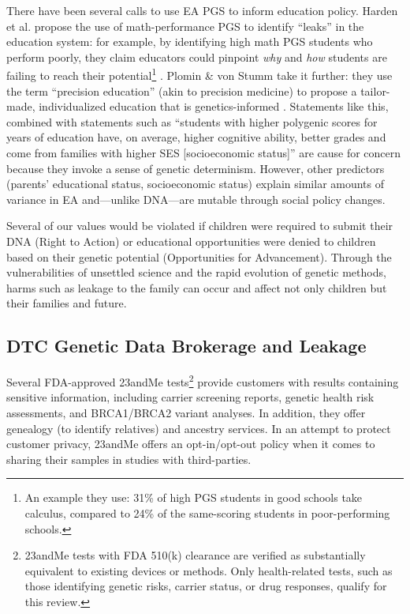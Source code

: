 There have been several calls to use EA PGS to inform education policy. Harden et al. propose the use of math-performance PGS to identify ``leaks'' in the education system: for example, by identifying high math PGS students who perform poorly, they claim educators could pinpoint \textit{why} and \textit{how} students are failing to reach their potential\footnote{An example they use: 31\% of high PGS students in good schools take calculus, compared to 24\% of the same-scoring students in poor-performing schools.} \cite{harden_genetic_2020}. Plomin \& von Stumm take it further: they use the term ``precision education'' (akin to precision medicine) to propose a tailor-made, individualized education that is genetics-informed \cite{r_new_2018}. Statements like this, combined with statements such as ``students with higher polygenic scores for years of education have, on average, higher cognitive ability, better grades and come from families with higher SES [socioeconomic status]'' \cite{smith-woolley_differences_2018} are cause for concern because they invoke a sense of genetic determinism. However, other predictors (parents' educational status, socioeconomic status) explain similar amounts of variance in EA \cite{lee_gene_2018, morris_can_2020} and—unlike DNA—are mutable through social policy changes. 

Several of our values would be violated if children were required to submit their DNA (Right to Action) or educational opportunities were denied to children based on their genetic potential (Opportunities for Advancement). Through the vulnerabilities of unsettled science and the rapid evolution of genetic methods, harms such as leakage to the family can occur and affect not only children but their families and future.



\subsection{DTC Genetic Data Brokerage and Leakage}
\label{case:dtc}

Several FDA-approved 23andMe tests\footnote{23andMe tests with FDA 510(k) clearance are verified as substantially equivalent to existing devices or methods. Only health-related tests, such as those identifying genetic risks, carrier status, or drug responses, qualify for this review.} provide customers with results containing sensitive information, including carrier screening reports, genetic health risk assessments, and BRCA1/BRCA2 variant analyses. In addition, they offer genealogy (to identify relatives) and ancestry services. In an attempt to protect customer privacy, 23andMe offers an opt-in/opt-out policy when it comes to sharing their samples in studies with third-parties.


